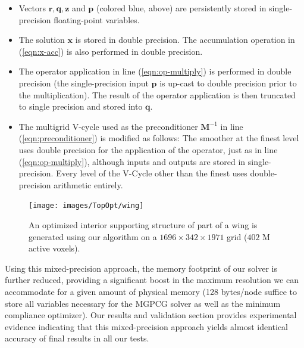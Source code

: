 \begin{itemize}
\item Vectors $\mathbf{r},\mathbf{q},\mathbf{z}$ and $\mathbf{p}$ (colored blue, above) are persistently stored in single-precision floating-point variables. 
\item The solution $\mathbf{x}$ is stored in double precision. The accumulation operation in (\ref{eqn:x-acc}) is also performed in double precision.
\item The operator application in line (\ref{eqn:op-multiply}) is performed in double precision (the single-precision input $\mathbf{p}$ is up-cast to double precision prior to the multiplication). The result of the operator application is then truncated to single precision and stored into $\mathbf{q}$.
\item The multigrid V-cycle used as the preconditioner $\mathbf{M}^{-1}$ in line (\ref{eqn:preconditioner}) is modified as follows: The smoother at the finest level uses double precision
  for the application of the operator, just as in line (\ref{eqn:op-multiply}), although inputs and outputs are stored in single-precision. Every level of the V-Cycle other than the
  finest uses double-precision arithmetic entirely.
\end{itemize}
\begin{figure}[t!]
\texttt{[image: images/TopOpt/wing]}
\caption{An optimized interior supporting structure of part of a wing is generated using our algorithm on a $1696\times 342\times1971$ grid ($402$ M active voxels).}
\label{fig:wing}
\end{figure}
Using this mixed-precision approach, the memory footprint of our solver is further reduced, providing a significant boost in the maximum resolution we can accommodate for a given amount of physical memory (128 bytes/node suffice to store all variables necessary for the MGPCG solver as well as the minimum compliance optimizer). Our results and validation section provides experimental evidence indicating that this mixed-precision approach yields almost identical accuracy of final results in all our tests.
